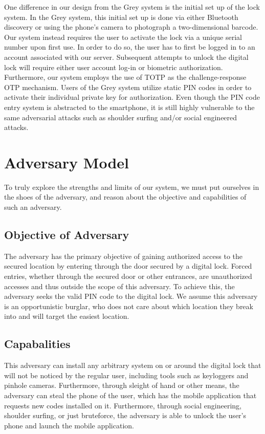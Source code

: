 \documentclass[conference]{IEEEtran}
\begin{document}
	One difference in our design from the Grey system is the initial set up of the lock system. In the Grey system, this initial set up is done via either Bluetooth discovery or using the phone’s camera to photograph a two-dimensional barcode. Our system instead requires the user to activate the lock via a unique serial number upon first use. In order to do so, the user has to first be logged in to an account associated with our server. Subsequent attempts to unlock the digital lock will require either user account log-in or biometric authorization. Furthermore, our system employs the use of TOTP as the challenge-response OTP mechanism. Users of the Grey system utilize static PIN codes in order to activate their individual private key for authorization. Even though the PIN code entry system is abstracted to the smartphone, it is still highly vulnerable to the same adversarial attacks such as shoulder surfing and/or social engineered attacks.

\section{Adversary Model}
To truly explore the strengths and limits of our system, we must put ourselves in the shoes of the adversary, and reason about the objective and capabilities of such an adversary.
\subsection{Objective of Adversary}
The adversary has the primary objective of gaining authorized access to the secured location by entering through the door secured by a digital lock. Forced entries, whether through the secured door or other entrances, are unauthorized accesses and thus outside the scope of this adversary. To achieve this, the adversary seeks the valid PIN code to the digital lock. We assume this adversary is an opportunistic burglar, who does not care about which location they break into and will target the easiest location.
\subsection{Capabalities}
	This adversary can install any arbitrary system on or around the digital lock that will not be noticed by the regular user, including tools such as keyloggers and pinhole cameras. Furthermore, through sleight of hand or other means, the adversary can steal the phone of the user, which has the mobile application that requests new codes installed on it. Furthermore, through social engineering, shoulder surfing, or just bruteforce, the adversary is able to unlock the user’s phone and launch the mobile application.
\end{document}
